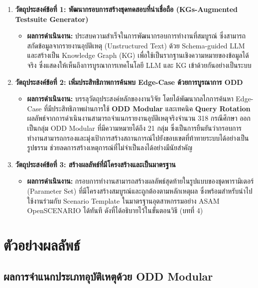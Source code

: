 \begin{enumerate}
    \item \textbf{วัตถุประสงค์ข้อที่ 1: พัฒนากรอบการสร้างชุดทดสอบที่น่าเชื่อถือ (KGs-Augmented Testsuite Generator)}
    \begin{itemize}
        \item \textbf{ผลการดำเนินงาน:} ประสบความสำเร็จในการพัฒนากรอบการทำงานที่สมบูรณ์ ซึ่งสามารถสกัดข้อมูลจากรายงานอุบัติเหตุ (Unstructured Text) ด้วย Schema-guided LLM และสร้างเป็น Knowledge Graph (KG) เพื่อใช้เป็นรากฐานเชิงความหมายของข้อมูลได้จริง ซึ่งแสดงให้เห็นถึงการบูรณาการเทคโนโลยี LLM และ KG เข้าด้วยกันอย่างเป็นระบบ
    \end{itemize}

    \item \textbf{วัตถุประสงค์ข้อที่ 2: เพิ่มประสิทธิภาพการค้นพบ Edge-Case ด้วยการบูรณาการ ODD}
    \begin{itemize}
        \item \textbf{ผลการดำเนินงาน:} บรรลุวัตถุประสงค์หลักของงานวิจัย โดยได้พัฒนากลไกการค้นหา Edge-Case ที่มีประสิทธิภาพผ่านการใช้ \textbf{ODD Modular} และเทคนิค \textbf{Query Rotation} ผลลัพธ์จากการดำเนินงานสามารถจำแนกรายงานอุบัติเหตุจริงจำนวน 318 กรณีศึกษา ออกเป็นกลุ่ม ODD Modular ที่มีความหมายได้ถึง 21 กลุ่ม ซึ่งเป็นการยืนยันว่ากรอบการทำงานสามารถกรองและมุ่งเป้าการสร้างสถานการณ์ไปยังขอบเขตที่ท้าทายระบบได้อย่างเป็นรูปธรรม ช่วยลดการสร้างเหตุการณ์ที่ไม่จำเป็นลงได้อย่างมีนัยสำคัญ
    \end{itemize}

    \item \textbf{วัตถุประสงค์ข้อที่ 3: สร้างผลลัพธ์ที่มีโครงสร้างและเป็นมาตรฐาน}
    \begin{itemize}
        \item \textbf{ผลการดำเนินงาน:} กรอบการทำงานสามารถสร้างผลลัพธ์สุดท้ายในรูปแบบของชุดพารามิเตอร์ (Parameter Set) ที่มีโครงสร้างสมบูรณ์และถูกต้องตามหลักเหตุผล ซึ่งพร้อมสำหรับนำไปใช้งานร่วมกับ Scenario Template ในมาตรฐานอุตสาหกรรมอย่าง ASAM OpenSCENARIO ได้ทันที ดังที่ได้อธิบายไว้ในขั้นตอนวิธี (บทที่ 4)
    \end{itemize}
\end{enumerate}

\section{ตัวอย่างผลลัพธ์}

\subsection{ผลการจำแนกประเภทอุบัติเหตุด้วย ODD Modular}
